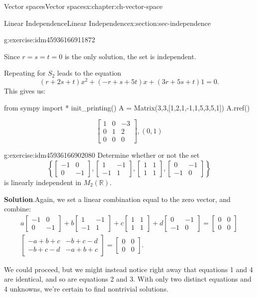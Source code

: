 \documentclass[oneside,10pt,]{book}
\newcommand{\blocktitlefont}{\relax}
\numberwithin{equation}{section}
\newcommand{\bbm}{\begin{bmatrix}}
\newcommand{\ebm}{\end{bmatrix}}
\newcommand{\amp}{&}
\begin{document}
\begin{chapterptx}{Vector spaces}{}{Vector spaces}{}{}{x:chapter:ch-vector-space}
\begin{sectionptx}{Linear Independence}{}{Linear Independence}{}{}{x:section:sec-independence}
\begin{inlineexercise}{}{g:exercise:idm45936166911872}
\par
Since \(r=s=t=0\) is the only solution, the set is independent.%
\par
Repeating for \(S_2\) leads to the equation%
\begin{equation*}
(r+2s+t)x^2+(-r+s+5t)x+(3r+5s+t)1=0.
\end{equation*}
This gives us:%
\begin{sageinput}
from sympy import *
init_printing()
A = Matrix(3,3,[1,2,1,-1,1,5,3,5,1])
A.rref()
\end{sageinput}
\begin{sageoutput}
\[\bbm 1\amp 0\amp -3\\0\amp 1\amp 2\\0\amp 0\amp 0\ebm, (0,1)\]
\end{sageoutput}
\end{inlineexercise}%
\begin{inlineexercise}{}{g:exercise:idm45936166902080}%
Determine whether or not the set%
\begin{equation*}
\left\{\bbm -1\amp 0\\0\amp -1\ebm, \bbm 1\amp -1\\ -1\amp 1\ebm,
\bbm 1\amp 1\\1\amp 1\ebm, \bbm 0\amp -1\\-1\amp 0\ebm\right\}
\end{equation*}
is linearly independent in \(M_2(\mathbb{R})\).%
\par\smallskip%
\noindent\textbf{\blocktitlefont Solution}.\label{g:solution:idm45936166900688}{}\hypertarget{g:solution:idm45936166900688}{}\quad{}Again, we set a linear combination equal to the zero vector, and combine:%
\begin{align*}
a\bbm -1\amp 0\\0\amp -1\ebm +b\bbm 1\amp -1\\ -1\amp 1\ebm
+c\bbm 1\amp 1\\1\amp 1\ebm +d \bbm 0\amp -1\\-1\amp 0\ebm = \bbm 0\amp 0\\ 0\amp 0\ebm\\
\bbm -a+b+c\amp -b+c-d\\-b+c-d\amp -a+b+c\ebm = \bbm 0\amp 0\\0\amp 0\ebm\text{.}
\end{align*}
%
\par
We could proceed, but we might instead notice right away that equations 1 and 4 are identical, and so are equations 2 and 3. With only two distinct equations and 4 unknowns, we're certain to find nontrivial solutions.%

\end{inlineexercise}
\end{sectionptx}
\end{chapterptx}
\end{document}
